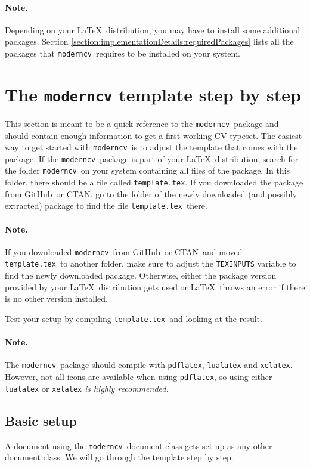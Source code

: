 \documentclass[a4paper, 11pt]{article}
\newcommand{\code}[1]{\lstinline!#1!}
\newcommand{\moderncv}{\code{moderncv}}
\newcommand{\Moderncv}{\moderncv~}
\newcommand{\github}{GitHub}
\newcommand{\Github}{\github~}
\newcommand{\ctan}{CTAN}
\newcommand{\Ctan}{\ctan~}
\newcommand{\cvtemplate}{\code{template.tex}}
\newcommand{\Cvtemplate}{\cvtemplate~}
\newcommand{\Latex}{\LaTeX~}
\begin{document}
\paragraph{Note.}
Depending on your \Latex distribution, you may have to install some additional packages.
Section \ref{section:implementationDetails:requiredPackages} lists all the packages that \Moderncv requires to be installed on your system.



\section{The \texttt{moderncv} template step by step}
This section is meant to be a quick reference to the \Moderncv package and should contain enough information to get a first working CV typeset.
\label{section:moderncvTemplate}
The easiest way to get started with \Moderncv is to adjust the template that comes with the package.
If the \Moderncv package is part of your \Latex distribution, search for the folder \Moderncv on your system containing all files of the package.
In this folder, there should be a file called \cvtemplate.
If you downloaded the package from \Github or \ctan, go to the folder of the newly downloaded (and possibly extracted) package to find the file \Cvtemplate there.

\paragraph{Note.}
If you downloaded \Moderncv from \Github or \Ctan and moved \Cvtemplate to another folder, make sure to adjust the \code{TEXINPUTS} variable to find the newly downloaded package.
Otherwise, either the package version provided by your \Latex distribution gets used or \Latex throws an error if there is no other version installed.

Test your setup by compiling \Cvtemplate and looking at the result.

\paragraph{Note.} The \Moderncv package should compile with \code{pdflatex}, \code{lualatex} and \code{xelatex}.
However, not all icons are available when using \code{pdflatex}, so using either \code{lualatex} or \code{xelatex} \emph{is highly recommended.}

\subsection{Basic setup}
A document using the \Moderncv document class gets set up as any other document class.
We will go through the template step by step.
\end{document}
